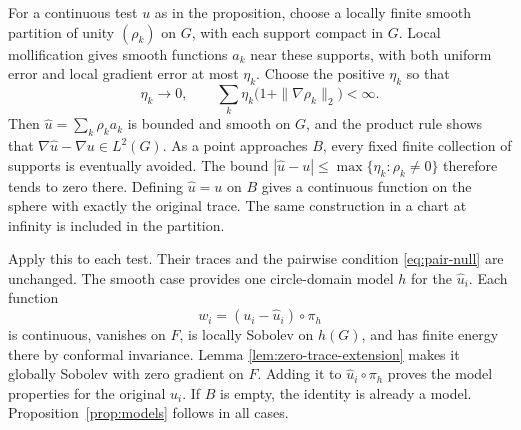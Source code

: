 For a continuous test $u$ as in the proposition, choose a locally
finite smooth partition of unity $(\rho_k)$ on $G$, with each support
compact in $G$.  Local mollification gives smooth functions $a_k$
near these supports, with both uniform error and local gradient
error at most $\eta_k$.  Choose the positive $\eta_k$ so that
\[
 \eta_k\longrightarrow0,\qquad
 \sum_k\eta_k\bigl(1+\|\nabla\rho_k\|_2\bigr)<\infty.
\]
Then $\widehat u=\sum_k\rho_k a_k$ is bounded and smooth on $G$,
and the product rule shows that
$\nabla\widehat u-\nabla u\in L^2(G)$.  As a point approaches $B$,
every fixed finite collection of supports is eventually avoided.
The bound $|\widehat u-u|\le\max\{\eta_k:\rho_k\ne0\}$ therefore
tends to zero there.  Defining $\widehat u=u$ on $B$ gives a continuous
function on the sphere with exactly the original trace.  The same
construction in a chart at infinity is included in the partition.

Apply this to each test.  Their traces and the pairwise condition
\eqref{eq:pair-null} are unchanged.
The smooth case provides one circle-domain model $h$ for the
$\widehat u_i$.  Each function
\[
 w_i=(u_i-\widehat u_i)\circ\pi_h
\]
is continuous, vanishes on $F$, is locally Sobolev on $h(G)$, and has
finite energy there by conformal invariance.  Lemma
\ref{lem:zero-trace-extension} makes it globally Sobolev with zero
gradient on $F$.  Adding it to $\widehat u_i\circ\pi_h$ proves the
model properties for the original $u_i$.  If $B$ is empty, the
identity is already a model.  Proposition~\ref{prop:models} follows
in all cases.
